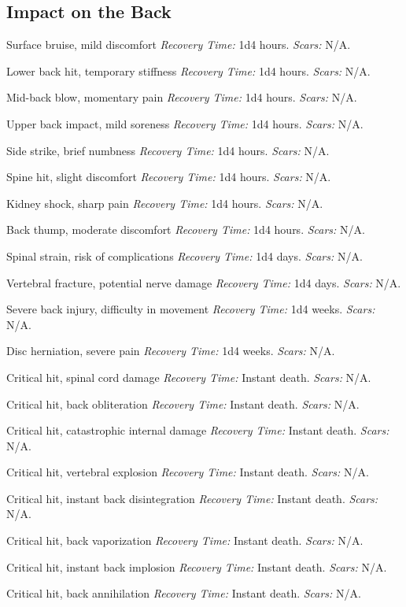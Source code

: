 \documentclass[12pt]{book}  %
\begin{document}
\subsection{Impact on the Back}

\begin{description}[labelwidth=1.5em, leftmargin=*, itemsep=0.4em]
    \item[1 -] Surface bruise, mild discomfort \textit{Recovery Time:} 1d4 hours. \textit{Scars:} N/A.
    \item[2 -] Lower back hit, temporary stiffness \textit{Recovery Time:} 1d4 hours. \textit{Scars:} N/A.
    \item[3 -] Mid-back blow, momentary pain \textit{Recovery Time:} 1d4 hours. \textit{Scars:} N/A.
    \item[4 -] Upper back impact, mild soreness \textit{Recovery Time:} 1d4 hours. \textit{Scars:} N/A.
    \item[5 -] Side strike, brief numbness \textit{Recovery Time:} 1d4 hours. \textit{Scars:} N/A.
    \item[6 -] Spine hit, slight discomfort \textit{Recovery Time:} 1d4 hours. \textit{Scars:} N/A.
    \item[7 -] Kidney shock, sharp pain \textit{Recovery Time:} 1d4 hours. \textit{Scars:} N/A.
    \item[8 -] Back thump, moderate discomfort \textit{Recovery Time:} 1d4 hours. \textit{Scars:} N/A.
    \item[9 -] Spinal strain, risk of complications \textit{Recovery Time:} 1d4 days. \textit{Scars:} N/A.
    \item[10 -] Vertebral fracture, potential nerve damage \textit{Recovery Time:} 1d4 days. \textit{Scars:} N/A.
    \item[11 -] Severe back injury, difficulty in movement \textit{Recovery Time:} 1d4 weeks. \textit{Scars:} N/A.
    \item[12 -] Disc herniation, severe pain \textit{Recovery Time:} 1d4 weeks. \textit{Scars:} N/A.
    \item[13 -] Critical hit, spinal cord damage \textit{Recovery Time:} Instant death. \textit{Scars:} N/A.
    \item[14 -] Critical hit, back obliteration \textit{Recovery Time:} Instant death. \textit{Scars:} N/A.
    \item[15 -] Critical hit, catastrophic internal damage \textit{Recovery Time:} Instant death. \textit{Scars:} N/A.
    \item[16 -] Critical hit, vertebral explosion \textit{Recovery Time:} Instant death. \textit{Scars:} N/A.
    \item[17 -] Critical hit, instant back disintegration \textit{Recovery Time:} Instant death. \textit{Scars:} N/A.
    \item[18 -] Critical hit, back vaporization \textit{Recovery Time:} Instant death. \textit{Scars:} N/A.
    \item[19 -] Critical hit, instant back implosion \textit{Recovery Time:} Instant death. \textit{Scars:} N/A.
    \item[20 -] Critical hit, back annihilation \textit{Recovery Time:} Instant death. \textit{Scars:} N/A.
\end{description}
\end{document}
